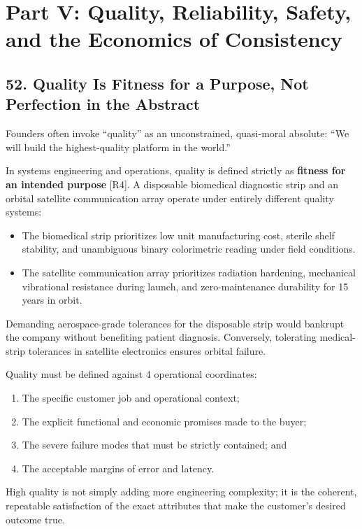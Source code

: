 \section*{Part V: Quality, Reliability, Safety, and the Economics of Consistency}

\subsection*{52. Quality Is Fitness for a Purpose, Not Perfection in the Abstract}

Founders often invoke ``quality'' as an unconstrained, quasi-moral absolute: ``We will build the highest-quality platform in the world.''

In systems engineering and operations, quality is defined strictly as \textbf{fitness for an intended purpose} [R4]. A disposable biomedical diagnostic strip and an orbital satellite communication array operate under entirely different quality systems:
\begin{itemize}
    \item The biomedical strip prioritizes low unit manufacturing cost, sterile shelf stability, and unambiguous binary colorimetric reading under field conditions.
    \item The satellite communication array prioritizes radiation hardening, mechanical vibrational resistance during launch, and zero-maintenance durability for 15 years in orbit.
\end{itemize}

Demanding aerospace-grade tolerances for the disposable strip would bankrupt the company without benefiting patient diagnosis. Conversely, tolerating medical-strip tolerances in satellite electronics ensures orbital failure.

Quality must be defined against 4 operational coordinates:
\begin{enumerate}
    \item The specific customer job and operational context;
    \item The explicit functional and economic promises made to the buyer;
    \item The severe failure modes that must be strictly contained; and
    \item The acceptable margins of error and latency.
\end{enumerate}

High quality is not simply adding more engineering complexity; it is the coherent, repeatable satisfaction of the exact attributes that make the customer's desired outcome true.

